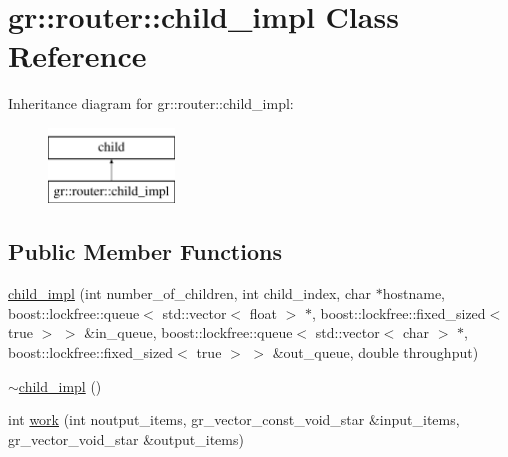 \hypertarget{classgr_1_1router_1_1child__impl}{\section{gr\+:\+:router\+:\+:child\+\_\+impl Class Reference}
\label{classgr_1_1router_1_1child__impl}
}
Inheritance diagram for gr\+:\+:router\+:\+:child\+\_\+impl\+:\begin{figure}[H]
\begin{center}
\leavevmode
\includegraphics[height=2.000000cm]{classgr_1_1router_1_1child__impl}
\end{center}
\end{figure}
\subsection*{Public Member Functions}
\begin{DoxyCompactItemize}
\item 
\hyperlink{classgr_1_1router_1_1child__impl_aabaff6e60fad3c91138087379a7aa5d3}{child\+\_\+impl} (int number\+\_\+of\+\_\+children, int child\+\_\+index, char $\ast$hostname, boost\+::lockfree\+::queue$<$ std\+::vector$<$ float $>$ $\ast$, boost\+::lockfree\+::fixed\+\_\+sized$<$ true $>$ $>$ \&in\+\_\+queue, boost\+::lockfree\+::queue$<$ std\+::vector$<$ char $>$ $\ast$, boost\+::lockfree\+::fixed\+\_\+sized$<$ true $>$ $>$ \&out\+\_\+queue, double throughput)
\item 
\hyperlink{classgr_1_1router_1_1child__impl_a65c85e62fd693c4a87811f73c7e6234b}{$\sim$child\+\_\+impl} ()
\item 
int \hyperlink{classgr_1_1router_1_1child__impl_a7a429a34494106bd743e5515eacc6605}{work} (int noutput\+\_\+items, gr\+\_\+vector\+\_\+const\+\_\+void\+\_\+star \&input\+\_\+items, gr\+\_\+vector\+\_\+void\+\_\+star \&output\+\_\+items)
\end{DoxyCompactItemize}


